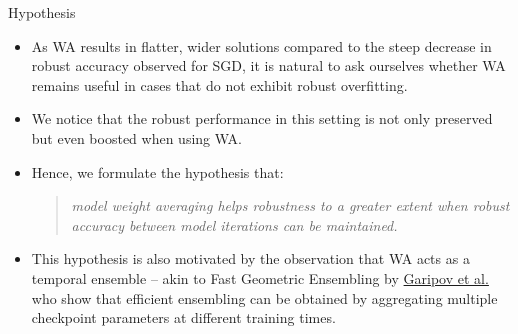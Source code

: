 \begin{frame}{Hypothesis}
    \begin{itemize}
        \item As WA results in flatter, wider solutions compared to the steep decrease in robust accuracy observed for SGD, it is natural to ask ourselves whether WA remains useful in cases that do not exhibit robust overfitting.
        \item We notice that the robust performance in this setting is not only preserved but even boosted when using WA. 
        \item Hence, we formulate the hypothesis that: 
            \begin{quote}
                \emph{model weight averaging helps robustness to a greater extent when robust accuracy between model iterations can be maintained.}
            \end{quote}
        \item This hypothesis is also motivated by the observation that WA acts as a temporal ensemble – akin to Fast Geometric Ensembling by \href{https://arxiv.org/pdf/1802.10026}{Garipov et al.} who show that efficient ensembling can be obtained by aggregating multiple checkpoint parameters at different training times.
    \end{itemize}
\end{frame}

